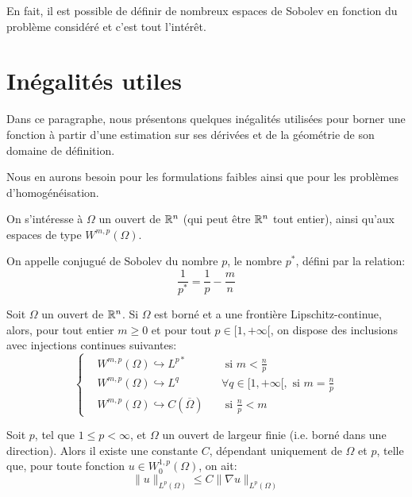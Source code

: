 En fait, il est possible de définir de nombreux espaces de Sobolev en fonction du problème considéré et c'est tout l'intérêt.

\medskip
\section{Inégalités utiles}
Dans ce paragraphe, nous présentons quelques inégalités utilisées pour borner une fonction à partir d'une estimation sur
ses dérivées et de la géométrie de son domaine de définition.

Nous en aurons besoin pour les formulations faibles ainsi que pour les problèmes d'homogénéisation.
\medskip
\begin{definition}
On s'intéresse à $\Omega$ un ouvert de $\mathbb R^n$ (qui peut être $\mathbb R^n$ tout entier), ainsi qu'aux
espaces de type $W^{m,p}(\Omega)$.

On appelle conjugué de Sobolev du nombre $p$, le nombre $p^*$, défini par la relation:
\begin{equation}
    \frac{1}{p^*} = \frac{1}{p} - \frac{m}{n}
\end{equation}
\end{definition}
\begin{theoreme}
Soit $\Omega$ un  ouvert de $\mathbb R^n$. Si $\Omega$ est borné et a une frontière Lipschitz-continue,
alors, pour tout entier $m\ge 0$ et pour tout $p\in[1,+\infty[$, on dispose des inclusions avec injections continues
suivantes:
\begin{equation}
\left\{\begin{aligned}
&W^{m,p}(\Omega) \hookrightarrow L^{p*} && \text{ si } m<\frac{n}p\\
&W^{m,p}(\Omega) \hookrightarrow L^q && \forall q\in[1,+\infty[, \text{ si } m=\frac{n}p\\
&W^{m,p}(\Omega) \hookrightarrow C(\overline{\Omega}) && \text{ si } \frac{n}p<m
\end{aligned}\right.
\end{equation}
\end{theoreme}


\medskip

\begin{theoreme}
Soit $p$, tel que $1 \le p <\infty$, et $\Omega$ un ouvert de largeur finie
(i.e. borné dans une direction).
Alors il existe une constante $C$, dépendant uniquement de $\Omega$ et $p$, telle que,
pour toute fonction $u\in W_0^{1,p}(\Omega)$, on ait:
\begin{equation}
\|u\|_{L^p(\Omega)} \le C \|\nabla u\|_{L^p(\Omega)}
\end{equation}
\end{theoreme}

